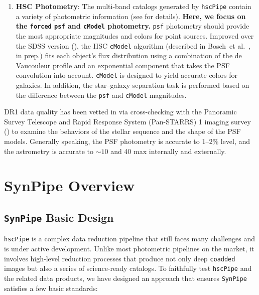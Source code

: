 \documentclass[useamsfonts]{pasj01}
\def\etal{{\ et al.~}}
\def\hscpipe{\texttt{hscPipe}}
\def\synpipe{\texttt{SynPipe}}
\def\cmodel{\texttt{cModel}}
\def\forced{\texttt{forced}}
\begin{document}
\begin{enumerate}
        \item \textbf{HSC Photometry}:
            The multi-band catalogs generated by \hscpipe{} contain a variety of photometric
            information (see \citealt{HSCDR1} for details).
            \textbf{Here, we focus on the \forced{} \texttt{psf} and \cmodel{}
            photometry.}
            \texttt{psf} photometry should provide the most appropriate magnitudes and
            colors for point sources.
            Improved over the SDSS version (\citealt{Lupton2001, Abazajian2004}),
            the HSC \cmodel{}{} algorithm (described in Bosch\etal, in prep.) fits 
           each object's flux distribution using a combination of the de Vaucouleur
            profile and an exponential component that takes the PSF convolution into account.
            \cmodel{} is designed to yield accurate colors for galaxies.
            In addition, the star--galaxy separation task is performed based on the
            difference between the \texttt{psf} and \cmodel{}{} magnitudes.

    \end{enumerate}

    DR1 data quality has been vetted in \citet{HSCDR1} via cross-checking
    with the Panoramic Survey Telescope and Rapid Response System (Pan-STARRS) 1
    imaging survey (\citealt{Schlafly2012, Tonry2012, Magnier2013}) to examine the
    behaviors of the stellar sequence and the shape of the PSF models.
    Generally speaking, the PSF photometry is accurate to 1--2\% level, and the
    astrometry is accurate to ${\sim}10$ and 40 max internally and externally.


\section{SynPipe Overview}
    \label{sec:synpipe}

\subsection{ \synpipe{} Basic Design}
    \label{ssec:design}

     \hscpipe{} is a complex data reduction pipeline that still faces many challenges
    and is under active development. 
    Unlike most photometric pipelines on the market, it involves high-level reduction
    processes that produce not only deep \texttt{coadded} images but also a series of
    science-ready catalogs.
    To faithfully test \hscpipe{} and the related data products, we have designed an approach that ensures
    \synpipe{} satisfies a few basic standards:
\end{document}

